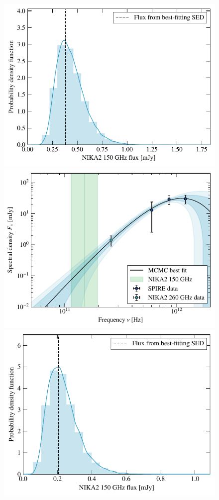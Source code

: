 \begin{figure}[p]
    \includegraphics[height=0.23\textheight]{Figures/Chap_actj0215/PSPlots/2_2mm_flux_dist.pdf}
    \includegraphics[height=0.23\textheight]{Figures/Chap_actj0215/PSPlots/3_SED_no2mm.pdf} \hspace{20pt}
    \includegraphics[height=0.23\textheight]{Figures/Chap_actj0215/PSPlots/3_2mm_flux_dist.pdf}

\end{figure}
